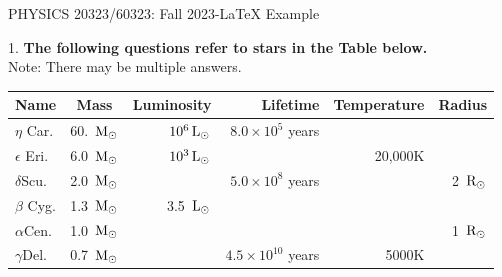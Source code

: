 \documentclass[12pt]{article}
\begin{document}
\def\pos{\medskip\quad}
\def\subpos{\smallskip \qquad}


\begin{center}
{\large
PHYSICS  20323/60323: Fall 2023-LaTeX Example 
}\\
\end{center}
\vskip0.1in
 1. {\bf  The following questions refer to stars in the Table below.}\\
Note: There may be multiple answers.\\
                  








\begin{tabular}{|l|c|r|r|r|r|}\hline
Name & Mass & Luminosity  & Lifetime & Temperature & Radius\\\hline
$\eta$ Car.   & 60.~$\textup{M}_\odot$  & $10^6\,\textup{L}_\odot$   & $8.0 \times 10^5$ years & {} &  \\\hline
$\epsilon$ Eri.  & 6.0~$\textup{M}_\odot$   &  $10^3\,\textup{L}_\odot$ & {} & 20,000K &   \\\hline
$\delta$Scu.   & 2.0~$\textup{M}_\odot$   &  {} & $5.0 \times 10^8$ years & {} & 2~$\textup{R}_\odot$    \\\hline
$\beta$ Cyg.  & 1.3~$\textup{M}_\odot$   &  3.5~$\textup{L}_\odot$ & {} & {} &   \\\hline
$\alpha$Cen.   & 1.0~$\textup{M}_\odot$    &  {} & {} & {} & 1~$\textup{R}_\odot$     \\\hline
$\gamma$Del.   & 0.7~$\textup{M}_\odot$   &  {} & $4.5 \times 10^{10}$ years & 5000K &   \\\hline
\end{tabular}\vskip 0.2in
\end{document}
